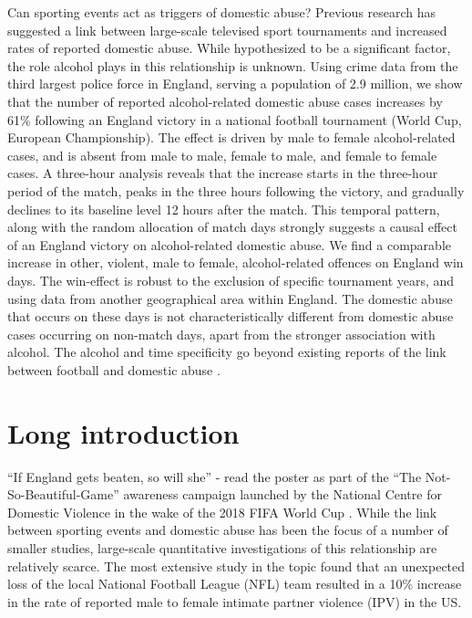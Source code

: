 \documentclass[12pt, letterpaper]{article}
\begin{document}
Can sporting events act as triggers of domestic abuse? Previous research has suggested a link between large-scale televised sport tournaments and increased rates of reported domestic abuse\autocite{Card2011,Kirby2014}. While hypothesized to be a significant factor, the role alcohol plays in this relationship is unknown. Using crime data from the third largest police force in England, serving a population of 2.9 million\autocite{populationfigure}, we show that the number of reported alcohol-related domestic abuse cases increases by 61\% following an England victory in a national football tournament (World Cup, European Championship). The effect is driven by male to female alcohol-related cases, and is absent from male to male, female to male, and female to female cases. A three-hour analysis reveals that the increase starts in the three-hour period of the match, peaks in the three hours following the victory, and gradually declines to its baseline level 12 hours after the match. This temporal pattern, along with the random allocation of match days strongly suggests a causal effect of an England victory on alcohol-related domestic abuse. We find a comparable increase in other, violent, male to female, alcohol-related offences on England win days.  The win-effect is robust to the exclusion of specific tournament years, and using data from another geographical area within England. The domestic abuse that occurs on these days is not characteristically different from domestic abuse cases occurring on non-match days, apart from the stronger association with alcohol. The alcohol and time specificity go beyond existing reports of the link between football and domestic abuse \autocite{Kirby2014,Brimicombe2012}. 


\section*{Long introduction}

``If England gets beaten, so will she'' - read the poster as part of the ``The Not-So-Beautiful-Game'' awareness campaign launched by the National Centre for Domestic Violence in the wake of the 2018 FIFA World Cup \autocite{NCDV}. While the link between sporting events and domestic abuse has been the focus of a number of smaller studies\autocite{Williams2014}, large-scale quantitative investigations of this relationship are relatively scarce. The most extensive study in the topic found that an unexpected loss of the local National Football League (NFL) team resulted in a 10\% increase in the rate of reported male to female intimate partner violence (IPV) in the US\autocite{Card2011}. 
\end{document}
